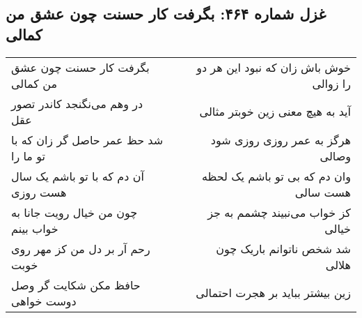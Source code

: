 \begin{center}
\section*{غزل شماره ۴۶۴: بگرفت کار حسنت چون عشق من کمالی}
\label{sec:sh464}
\begin{longtable}{l p{0.5cm} r}
بگرفت کار حسنت چون عشق من کمالی
&&
خوش باش زان که نبود این هر دو را زوالی
\\
در وهم می‌نگنجد کاندر تصور عقل
&&
آید به هیچ معنی زین خوبتر مثالی
\\
شد حظ عمر حاصل گر زان که با تو ما را
&&
هرگز به عمر روزی روزی شود وصالی
\\
آن دم که با تو باشم یک سال هست روزی
&&
وان دم که بی تو باشم یک لحظه هست سالی
\\
چون من خیال رویت جانا به خواب بینم
&&
کز خواب می‌نبیند چشمم به جز خیالی
\\
رحم آر بر دل من کز مهر روی خوبت
&&
شد شخص ناتوانم باریک چون هلالی
\\
حافظ مکن شکایت گر وصل دوست خواهی
&&
زین بیشتر بباید بر هجرت احتمالی
\\
\end{longtable}
\end{center}
